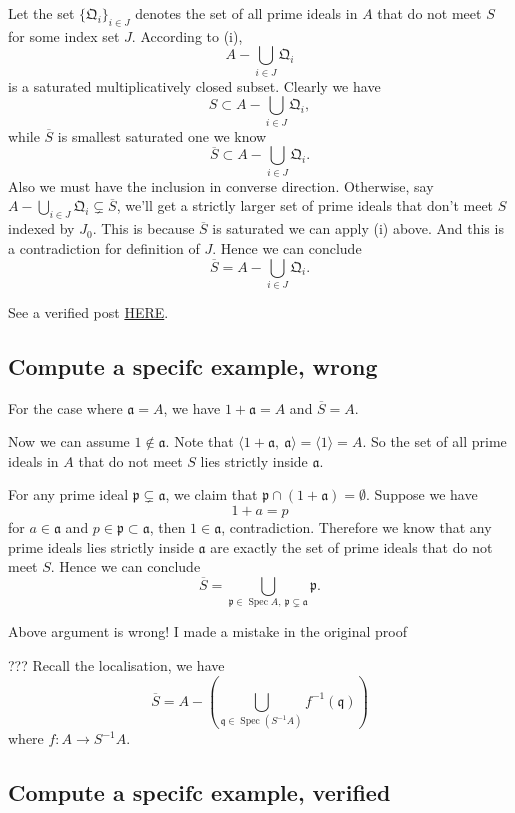 Let the set $\{\mathfrak Q_i\}_{i\in J}$ denotes the set of all prime ideals in $A$ that do not meet $S$ for some index set $J$. According to (i),
$$A-\bigcup_{i\in J}\mathfrak Q_i$$ is a saturated multiplicatively closed subset. 
Clearly we have 
$$S\subset A-\bigcup_{i\in J}\mathfrak Q_i,$$ while $\overline{S}$ is smallest saturated one we know
$$\overline{S} \subset A-\bigcup_{i\in J}\mathfrak Q_i.$$
Also we must have the inclusion in converse direction. Otherwise, say $A-\bigcup_{i\in J}\mathfrak Q_i\subsetneq \overline{S}$, we'll get a strictly larger set of prime ideals that don't meet $S$ indexed by $J_0$. This is because $\overline{S}$ is saturated we can apply (i) above. And this is a contradiction for definition of $J$. Hence we can conclude 
$$\overline{S}= A-\bigcup_{i\in J}\mathfrak Q_i.$$

See a verified post \href{http://www.math.caltech.edu/~2016-17/1term/ma120a/solutions/Sol1.pdf}{HERE}. 

\subsection{Compute a specifc example, wrong}

For the case where $\mathfrak a=A$, we have $1+\mathfrak a=A$ and $\overline{S}=A$.

Now we can assume $1\notin \mathfrak a$.
Note that $\langle 1+\mathfrak a,~ \mathfrak a\rangle=\langle 1\rangle=A$. So the set of all prime ideals in $A$ that do not meet $S$ lies strictly inside $\mathfrak a$. 

For any prime ideal $\mathfrak p\subsetneq \mathfrak a$, we claim that $\mathfrak p\cap (1+\mathfrak a)=\emptyset$. Suppose we have 
$$1+a=p$$ for $a\in\mathfrak a$ and $p\in\mathfrak p\subset\mathfrak a$, then $1\in \mathfrak a$, contradiction. 
Therefore we know that any prime ideals lies strictly inside $\mathfrak a$ are exactly the set of prime ideals that do not meet $S$. Hence we can conclude 
$$\overline{S}=\bigcup_{\mathfrak p\in\operatorname{Spec}A,~\mathfrak p\subsetneq \mathfrak a}\mathfrak p.$$

Above argument is wrong! I made a mistake in the original proof 

??? Recall the localisation, we have 
$$\overline{S}=A-\left(\bigcup_{\mathfrak q\in\operatorname{Spec}(S^{-1}A)}f^{-1}(\mathfrak q)\right)$$ where $f:A\to S^{-1}A$.

\subsection{Compute a specifc example, verified}

